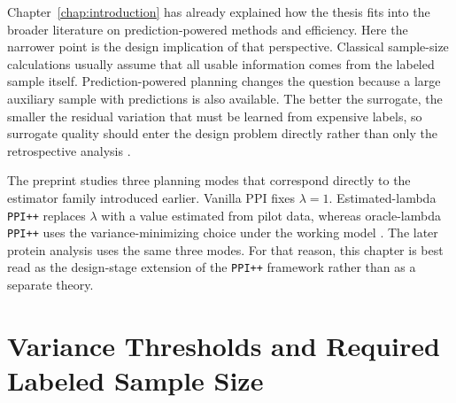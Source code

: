 Chapter~\ref{chap:introduction} has already explained how the thesis fits into the broader literature on prediction-powered methods and efficiency. Here the narrower point is the design implication of that perspective. Classical sample-size calculations usually assume that all usable information comes from the labeled sample itself. Prediction-powered planning changes the question because a large auxiliary sample with predictions is also available. The better the surrogate, the smaller the residual variation that must be learned from expensive labels, so surrogate quality should enter the design problem directly rather than only the retrospective analysis \parencite{eif_ref, tsiatis2006, ppi_framework}.

The preprint studies three planning modes that correspond directly to the estimator family introduced earlier. Vanilla PPI fixes $\lambda = 1$. Estimated-lambda \texttt{PPI++} replaces $\lambda$ with a value estimated from pilot data, whereas oracle-lambda \texttt{PPI++} uses the variance-minimizing choice under the working model \parencite{ppi_pp, ppi_power}. The later protein analysis uses the same three modes. For that reason, this chapter is best read as the design-stage extension of the \texttt{PPI++} framework rather than as a separate theory.

\section{Variance Thresholds and Required Labeled Sample Size}

